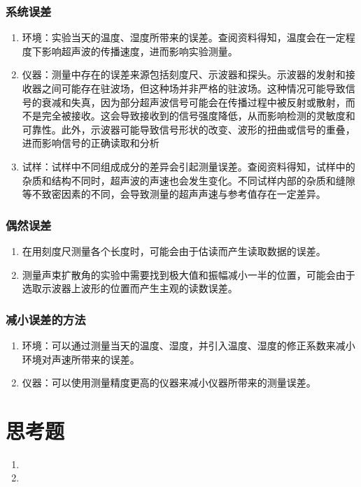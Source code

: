 \subsubsection{系统误差}
\begin{enumerate}
    \item 环境：实验当天的温度、湿度所带来的误差。查阅资料得知，温度会在一定程度下影响超声波的传播速度，进而影响实验测量。
    \item 仪器：测量中存在的误差来源包括刻度尺、示波器和探头。示波器的发射和接收器之间可能存在驻波场，但这种场并非严格的驻波场。这种情况可能导致信号的衰减和失真，因为部分超声波信号可能会在传播过程中被反射或散射，而不是完全被接收。这会导致接收到的信号强度降低，从而影响检测的灵敏度和可靠性。此外，示波器可能导致信号形状的改变、波形的扭曲或信号的重叠，进而影响信号的正确读取和分析
    \item 试样：试样中不同组成成分的差异会引起测量误差。查阅资料得知，试样中的杂质和结构不同时，超声波的声速也会发生变化。不同试样内部的杂质和缝隙等不致密因素的不同，会导致测量的超声声速与参考值存在一定差异。
\end{enumerate}
\subsubsection{偶然误差}
\begin{enumerate}
    \item 在用刻度尺测量各个长度时，可能会由于估读而产生读取数据的误差。
    \item 测量声束扩散角的实验中需要找到极大值和振幅减小一半的位置，可能会由于选取示波器上波形的位置而产生主观的读数误差。
\end{enumerate}
\subsubsection{减小误差的方法}
\begin{enumerate}
    \item 环境：可以通过测量当天的温度、湿度，并引入温度、湿度的修正系数来减小环境对声速所带来的误差。
    \item 仪器：可以使用测量精度更高的仪器来减小仪器所带来的测量误差。
\end{enumerate}
\section{思考题}
\begin{enumerate}
    \item {}
    \item {}
\end{enumerate}